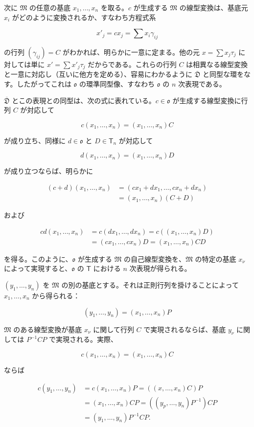 次に $\mathfrak M$ の任意の基底 $x_1,\ldots,x_n$ を取る。$c$ が生成する $\mathfrak M$ の線型変換は、基底元 $x_i$ がどのように変換されるか、すなわち方程式系

\[
x'_j=cx_j=\sum x_i\gamma_{ij}
\]

の行列 $(\gamma_{ij})=C$ がわかれば、明らかに一意に定まる。他の元 $x=\sum x_j\tau_j$ に対しては単に $x'=\sum x'_j\tau_j$ だからである。これらの行列 $C$ は相異なる線型変換と一意に対応し（互いに他方を定める）、容易にわかるように $\overline{\mathfrak D}$ と同型な環をなす。したがってこれは $\mathfrak{o}$ の環準同型像、すなわち $\mathfrak{o}$ の $n$ 次表現である。

$\overline{\mathfrak D}$ とこの表現との同型は、次の式に表れている。$c\in\mathfrak{o}$ が生成する線型変換に行列 $C$ が対応して

\[
c(x_1,\ldots,x_n)=(x_1,\ldots,x_n)C
\]

が成り立ち、同様に $d\in\mathfrak{o}$ と $D\in\mathsf T_n$ が対応して

\[
d(x_1,\ldots,x_n)=(x_1,\ldots,x_n)D
\]

が成り立つならば、明らかに

\[
\begin{aligned}
(c+d)(x_1,\ldots,x_n)
&=(cx_1+dx_1,\ldots,cx_n+dx_n)\\
&=(x_1,\ldots,x_n)(C+D)
\end{aligned}
\]

および

\[
\begin{aligned}
cd(x_1,\ldots,x_n)
&=c(dx_1,\ldots,dx_n)=c((x_1,\ldots,x_n)D)\\
&=(cx_1,\ldots,cx_n)D=(x_1,\ldots,x_n)CD
\end{aligned}
\]

を得る。このように、$\mathfrak{o}$ が生成する $\mathfrak M$ の自己線型変換を、$\mathfrak M$ の特定の基底 $x_\nu$ によって実現すると、$\mathfrak{o}$ の $\mathsf T$ における $n$ 次表現が得られる。

$(y_1,\ldots,y_n)$ を $\mathfrak M$ の別の基底とする。それは正則行列を掛けることによって $x_1,\ldots,x_n$ から得られる：

\[(y_1,\ldots,y_n)=(x_1,\ldots,x_n)P\]

$\mathfrak M$ のある線型変換が基底 $x_\nu$ に関して行列 $C$ で実現されるならば、基底 $y_\nu$ に関しては $P^{-1}CP$ で実現される。実際、

\[c(x_1,\ldots,x_n)=(x_1,\ldots,x_n)C\]

ならば

\[
\begin{aligned}
c(y_1,\ldots,y_n)
&=c(x_1,\ldots,x_n)P=((x,\ldots,x_n)C)P\\
&=(x_1,\ldots,x_n)CP=((y_p,\ldots,y_n)P^{-1})CP\\
&=(y_1,\ldots,y_n)P^{-1}CP.
\end{aligned}
\]

